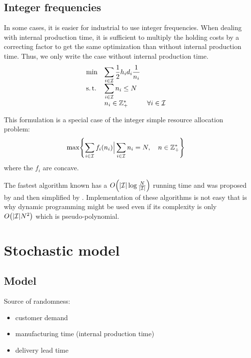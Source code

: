 \subsection{Integer frequencies}


In some cases, it is easier for industrial to use integer frequencies. When dealing with internal production time, it is sufficient to multiply the holding costs by a correcting factor to get the same optimization than without internal production time. Thus, we only write the case without internal production time.
\begin{equation}
  \begin{array}{lll}
  \min & \displaystyle\sum_{i\in\mathcal{I}} \frac{1}{2}h_id_i\frac{1}{n_i} \\
  \operatorname{s.t.}  & \displaystyle\sum_{i\in\mathcal{I}} n_i \le N \\
       & n_i \in \mathbb{Z}_+^* & \forall i\in\mathcal{I}
  \end{array}
\end{equation}

This formulation is a special case of the integer simple resource allocation problem:
\begin{equation}
  \max\crbracket{\sum_{i\in\REF} f_i\bracket{\freq_i} \Big| \sum_{i\in\REF}\freq_i=\nbsetups,\quad\freq\in \ZZ_+^*}
\end{equation}
where the $f_i$ are concave.

The fastest algorithm known has a $O\bracket{\card{\REF}\log{\frac{\nbsetups}{\card{\REF}}}}$ running time and was proposed by \cite{Frederickson1982} and then simplified by \cite{Hochbaum1994}. Implementation of these algorithms is not easy that is why dynamic programming might be used even if its complexity is only $O\bracket{\card{\REF}\nbsetups^2}$ which is pseudo-polynomial.



\section{Stochastic model}


\subsection{Model}

Source of randomness:
\begin{itemize}
  \item customer demand
  \item manufacturing time (internal production time)
  \item delivery lead time
\end{itemize}

